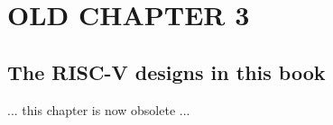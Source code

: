 

\chapter{OLD CHAPTER 3}


\setcounter{page}{1}
\renewcommand{\thepage}{\arabic{chapter}-\arabic{page}}

\label{ch_RISCV_Design_Space}


\section{The RISC-V designs in this book}

... this chapter is now obsolete ...

